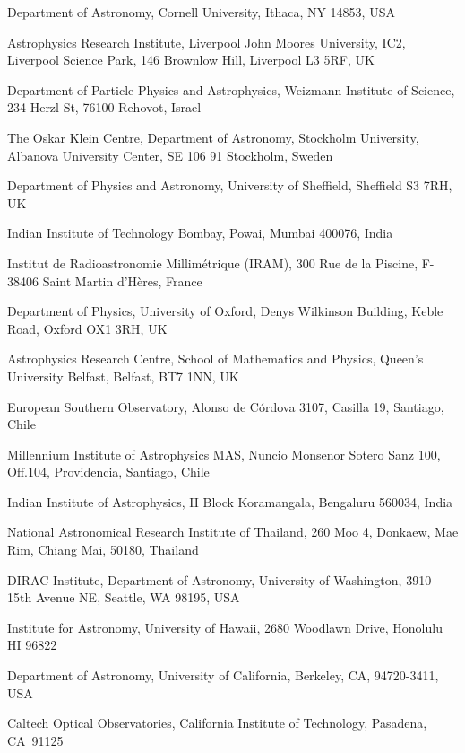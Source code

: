 \documentclass{nature_plusfigure}
\begin{document}
\begin{small}
\begin{affiliations}
\label{sec:affiliations}

\item Department of Astronomy, Cornell University, Ithaca, NY 14853, USA
\item Astrophysics Research Institute, Liverpool John Moores University, IC2, Liverpool Science Park, 146 Brownlow Hill, Liverpool L3 5RF, UK
\item Department of Particle Physics and Astrophysics, Weizmann Institute of Science, 234 Herzl St, 76100 Rehovot, Israel
\item The Oskar Klein Centre, Department of Astronomy, Stockholm University, Albanova University Center, SE 106 91 Stockholm, Sweden
\item Department of Physics and Astronomy, University of Sheffield, Sheffield S3 7RH, UK
\item Indian Institute of Technology Bombay, Powai, Mumbai 400076, India
\item Institut de Radioastronomie Millimétrique (IRAM), 300 Rue de la Piscine, F-38406 Saint Martin d’Hères, France
\item Department of Physics, University of Oxford, Denys Wilkinson Building, Keble Road, Oxford OX1 3RH, UK
\item Astrophysics Research Centre, School of Mathematics and Physics, Queen’s University Belfast, Belfast, BT7 1NN, UK
\item European Southern Observatory, Alonso de C\'ordova 3107, Casilla 19, Santiago, Chile
\item Millennium Institute of Astrophysics MAS, Nuncio Monsenor Sotero Sanz 100, Off.104, Providencia, Santiago, Chile
\item Indian Institute of Astrophysics, II Block Koramangala, Bengaluru 560034, India
\item National Astronomical Research Institute of Thailand, 260 Moo 4, Donkaew, Mae Rim, Chiang Mai, 50180, Thailand
\item DIRAC Institute, Department of Astronomy, University of Washington, 3910 15th Avenue NE, Seattle, WA 98195, USA
\item Institute for Astronomy, University of Hawaii, 2680 Woodlawn Drive, Honolulu HI 96822
\item Department of Astronomy, University of California, Berkeley, CA, 94720-3411, USA 
\item Caltech Optical Observatories, California Institute of Technology, Pasadena, CA 91125

\end{affiliations}
\end{small}
\end{document}
